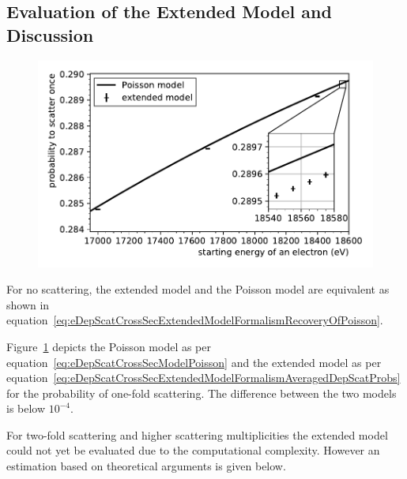 \subsection{Evaluation of the Extended Model and Discussion}
\label{sec:eDepScatCrossSecExtendedModelDiscussion}
\begin{figure}[t]
	\centering
	\includegraphics{chapter/energyDependentCrossSec/fig/scatProbs1PoissonAndExtended.pdf}
	\label{fig:eDepScatCrossSecExtendedModelResults}
\end{figure}
For no scattering, the extended model and the Poisson model are equivalent as shown in equation~\eqref{eq:eDepScatCrossSecExtendedModelFormalismRecoveryOfPoisson}.

Figure~\ref{fig:eDepScatCrossSecExtendedModelResults} depicts the Poisson model as per equation~\eqref{eq:eDepScatCrossSecModelPoisson} and the extended model as per equation~\eqref{eq:eDepScatCrossSecExtendedModelFormalismAveragedDepScatProbs} for the probability of one-fold scattering. The difference between the two models is below $10^{-4}$.

For two-fold scattering and higher scattering multiplicities the extended model could not yet be evaluated due to the computational complexity. However an estimation based on theoretical arguments is given below.

